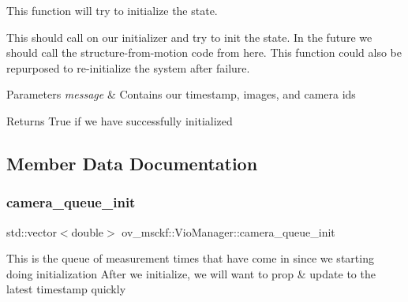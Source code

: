 This function will try to initialize the state. 

This should call on our initializer and try to init the state. In the future we should call the structure-\/from-\/motion code from here. This function could also be repurposed to re-\/initialize the system after failure.


\begin{DoxyParams}{Parameters}
{\em message} & Contains our timestamp, images, and camera ids \\
\hline
\end{DoxyParams}
\begin{DoxyReturn}{Returns}
True if we have successfully initialized 
\end{DoxyReturn}


\subsection{Member Data Documentation}
\mbox{\label{classov__msckf_1_1VioManager_a3d64db49753d6ae3ae946257c1a8e184}} 
\subsubsection{\texorpdfstring{camera\+\_\+queue\+\_\+init}{camera\_queue\_init}}
{\footnotesize\ttfamily std\+::vector$<$double$>$ ov\+\_\+msckf\+::\+Vio\+Manager\+::camera\+\_\+queue\+\_\+init\hspace{0.3cm}{\ttfamily [protected]}}

This is the queue of measurement times that have come in since we starting doing initialization After we initialize, we will want to prop \& update to the latest timestamp quickly 